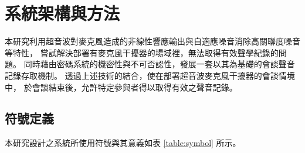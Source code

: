 \chapter{系統架構與方法}\label{chapter:method}

    本研究利用超音波對麥克風造成的非線性響應輸出與自適應噪音消除高關聯度噪音等特性，
嘗試解決部署有麥克風干擾器的場域裡，無法取得有效聲學紀錄的問題\cite{chen2020wearable}。
同時藉由密碼系統的機密性與不可否認性，發展一套以其為基礎的會談聲音記錄存取機制。
透過上述技術的結合，使在部署超音波麥克風干擾器的會談情境中，
於會談結束後，允許特定參與者得以取得有效之聲音記錄。


\section{符號定義}\label{sec:symbol}

    本研究設計之系統所使用符號與其意義如表 \ref{table:symbol} 所示。

